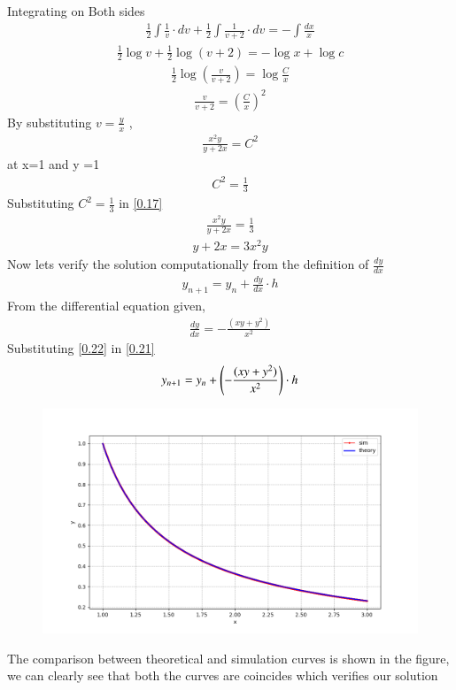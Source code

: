 \documentclass[journal]{IEEEtran}
\begin{document}
Integrating on Both sides
\begin{align}
   \frac{1}{2}\int\frac{1}{v} \cdot dv + \frac{1}{2}\int\frac{1}{v+2}\cdot dv = -\int \frac{dx}{x}
\end{align}
\begin{align}
    \frac{1}{2}\log v + \frac{1}{2}\log (v+2) = - \log{x} + \log c
\end{align}
\begin{align}
    \frac{1}{2} \log (\frac{v}{v+2}) = \log \frac{C}{x}
\end{align}
\begin{align}
    \frac{v}{v+2} = (\frac{C}{x})^2
\end{align}
By substituting $v=\frac{y}{x}$ ,
\begin{align}
    \frac{x^2 y}{y+2x} =  C^2
    \label{0.17}
\end{align}
at x=1 and y =1 
\begin{align}
    C^2 = \frac{1}{3}
\end{align}
Substituting $C^2 = \frac{1}{3}$ in \ref{0.17} 
\begin{align}
    \frac{x^2y}{y+2x} = \frac{1}{3}
\end{align}
\begin{align}
    y+2x = 3x^2y
\end{align}
Now lets verify the solution computationally from the definition of $\frac{dy}{dx}$
\begin{align}
    y_{n+1}= y_{n} + \frac{dy}{dx} \cdot h
    \label{0.21}
\end{align}
From the differential equation given,
\begin{align}
    \frac{dy}{dx} = -\frac{(xy+y^2)}{x^2}
    \label{0.22}
\end{align}
Substituting \ref{0.22} in \ref{0.21}
\begin{align}
    y_{n+1} = y_n + \left(-\frac{(xy+y^2)}{x^2}\right) \cdot h 
\end{align}
\begin{figure}
    \centering
    \includegraphics[width=\columnwidth]{figs/Figure_1.png}
\end{figure}
The comparison between theoretical and simulation curves is shown in the figure, we can clearly see that both the curves are coincides which verifies our solution
\end{document}
